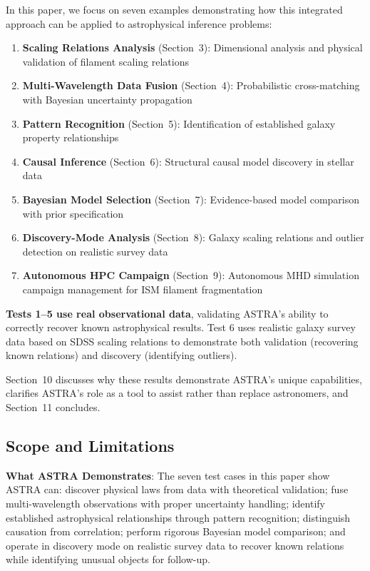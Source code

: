 \documentclass[usenatbib]{rasti}
\begin{document}
In this paper, we focus on seven examples demonstrating how this integrated approach can be applied to astrophysical inference problems:
\begin{enumerate}
\item \textbf{Scaling Relations Analysis} (Section~3): Dimensional analysis and physical validation of filament scaling relations
\item \textbf{Multi-Wavelength Data Fusion} (Section~4): Probabilistic cross-matching with Bayesian uncertainty propagation
\item \textbf{Pattern Recognition} (Section~5): Identification of established galaxy property relationships
\item \textbf{Causal Inference} (Section~6): Structural causal model discovery in stellar data
\item \textbf{Bayesian Model Selection} (Section~7): Evidence-based model comparison with prior specification
\item \textbf{Discovery-Mode Analysis} (Section~8): Galaxy scaling relations and outlier detection on realistic survey data
\item \textbf{Autonomous HPC Campaign} (Section~9): Autonomous MHD simulation campaign management for ISM filament fragmentation
\end{enumerate}

\textbf{Tests 1--5 use real observational data}, validating ASTRA's ability to correctly recover known astrophysical results. Test 6 uses realistic galaxy survey data based on SDSS scaling relations to demonstrate both validation (recovering known relations) and discovery (identifying outliers).

Section~10 discusses why these results demonstrate ASTRA's unique capabilities, clarifies ASTRA's role as a tool to assist rather than replace astronomers, and Section~11 concludes.

\subsection{Scope and Limitations}

\textbf{What ASTRA Demonstrates}: The seven test cases in this paper show ASTRA can: discover physical laws from data with theoretical validation; fuse multi-wavelength observations with proper uncertainty handling; identify established astrophysical relationships through pattern recognition; distinguish causation from correlation; perform rigorous Bayesian model comparison; and operate in discovery mode on realistic survey data to recover known relations while identifying unusual objects for follow-up.
\end{document}
